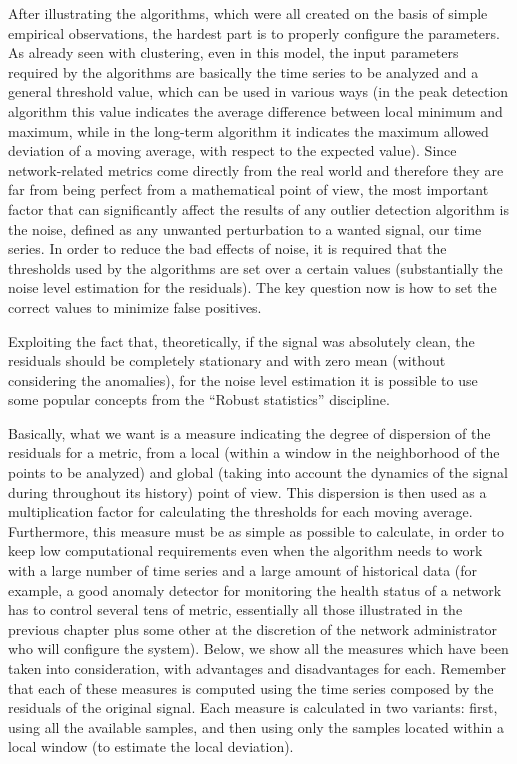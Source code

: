 \documentclass[12pt,a4paper,cucitura]{toptesi}
\begin{document}
After illustrating the algorithms, which were all created on the basis of simple empirical observations, the hardest part is to properly configure the parameters. 
As already seen with clustering, even in this model, the input parameters required by the algorithms are basically the time series to be analyzed and a general threshold value, which can be used in various ways (in the peak detection algorithm this value indicates the average difference between local minimum and maximum, while in the long-term algorithm it indicates the maximum allowed deviation of a moving average, with respect to the expected value).
Since network-related metrics come directly from the real world and therefore they are far from being perfect from a mathematical point of view, the most important factor that can significantly affect the results of any outlier detection algorithm is the noise, defined as any unwanted perturbation to a wanted signal, our time series. 
In order to reduce the bad effects of noise, it is required that the thresholds used by the algorithms are set over a certain values (substantially the noise level estimation for the residuals). The key question now is how to set the correct values to minimize false positives.

Exploiting the fact that, theoretically, if the signal was absolutely clean, the residuals should be completely stationary and with zero mean (without considering the anomalies), for the noise level estimation it is possible to use some popular concepts from the ``Robust statistics'' discipline.

Basically, what we want is a measure indicating the degree of dispersion of the residuals for a metric, from a local (within a window in the neighborhood of the points to be analyzed) and global (taking into account the dynamics of the signal during throughout its history) point of view.
This dispersion is then used as a multiplication factor for calculating the thresholds for each moving average.
Furthermore, this measure must be as simple as possible to calculate, in order to keep low computational requirements even when the algorithm needs to work with a large number of time series and a large amount of historical data (for example, a good anomaly detector for monitoring the health status of a network has to control several tens of metric, essentially all those illustrated in the previous chapter plus some other at the discretion of the network administrator who will configure the system).
Below, we show all the measures which have been taken into consideration, with advantages and disadvantages for each. Remember that each of these measures is computed using the time series composed by the residuals of the original signal. Each measure is calculated in two variants: first, using all the available samples, and then  using only the samples located within a local window (to estimate the local deviation).
\end{document}
